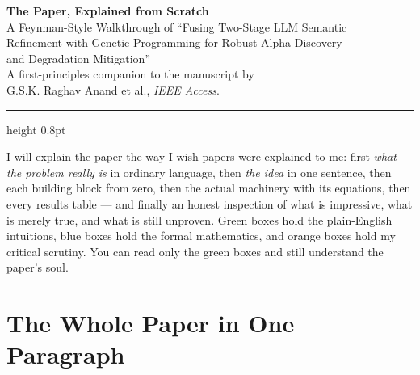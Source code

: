 \documentclass[11pt,a4paper]{article}
\begin{document}
\begin{center}
  {\LARGE\bfseries\color{navy} The Paper, Explained from Scratch}\\[6pt]
  {\large\color{ink} A Feynman-Style Walkthrough of ``Fusing Two-Stage LLM Semantic\\
  Refinement with Genetic Programming for Robust Alpha Discovery\\
  and Degradation Mitigation''}\\[8pt]
  {\small A first-principles companion to the manuscript by\\
  G.S.K. Raghav Anand et al., \emph{IEEE Access}.}
\end{center}

\vspace{2pt}
\hrule height 0.8pt
\vspace{8pt}

\begin{plaineng}
I will explain the paper the way I wish papers were explained to me: first
\emph{what the problem really is} in ordinary language, then \emph{the idea} in one
sentence, then each building block from zero, then the actual machinery with its
equations, then every results table --- and finally an honest inspection of what is
impressive, what is merely true, and what is still unproven. Green boxes hold the
plain-English intuitions, blue boxes hold the formal mathematics, and orange boxes
hold my critical scrutiny. You can read only the green boxes and still understand
the paper's soul.
\end{plaineng}

\section*{The Whole Paper in One Paragraph}
\end{document}
